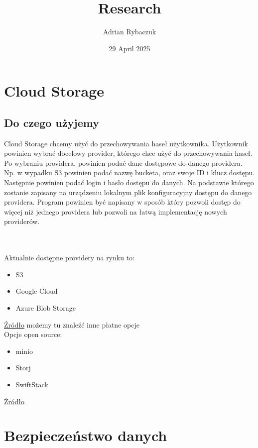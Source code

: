 \documentclass[11pt, a4paper]{article}
\begin{document}
\title{Research}
\author{Adrian Rybaczuk}
\date{29 April 2025}
\maketitle

\section{Cloud Storage}
\subsection{Do czego użyjemy}
\begin{paragraph}
    Cloud Storage chcemy użyć do przechowywania haseł użytkownika.
    Użytkownik powinien wybrać docelowy provider, którego chce użyć do przechowywania haseł.
    Po wybraniu providera, powinien podać dane dostępowe do danego providera.
    Np. w wypadku S3 powinien podać nazwę bucketa, oraz swoje ID i klucz dostępu.
    Następnie powinien podać login i hasło dostępu do danych.
    Na podstawie którego zostanie zapisany na urządzeniu lokalnym plik konfiguracyjny dostępu do danego providera.
    Program powinien być napisany w sposób który pozwoli dostęp do więcej niż jednego providera lub pozwoli na łatwą implementację nowych providerów.
\end{paragraph} \\\\
Aktualnie dostępne providery na rynku to:
\begin{itemize}
    \item S3
    \item Google Cloud 
    \item Azure Blob Storage
\end{itemize}
\href{https://www.digitalocean.com/resources/articles/amazon-s3-alternatives}{Źródło} możemy tu znaleźć inne płatne opcje \\

Opcje open source:
\begin{itemize}
    \item minio
    \item Storj
    \item SwiftStack
\end{itemize}
\href{https://opensourcealternative.to/alternativesto/amazon-s3}{Źródło}

\section{Bezpieczeństwo danych}
\end{document}

